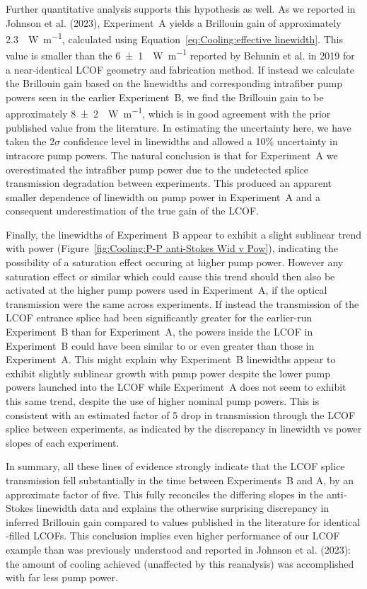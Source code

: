 Further quantitative analysis supports this hypothesis as well. As we reported in Johnson et al. (2023), \cite{johnson2023laser} Experiment~A yields a Brillouin gain of approximately \SI{2.3}{\per\watt\per\meter}, calculated using Equation~\ref{eq:Cooling:effective linewidth}. This value is smaller than the \SI{6(1)}{\per\watt\per\meter} reported by Behunin et al. in 2019 \cite{behunin2019spontaneous} for a near‐identical \ac{LCOF} geometry and fabrication method. If instead we calculate the Brillouin gain based on the linewidths and corresponding intrafiber pump powers seen in the earlier Experiment~B, we find the Brillouin gain to be approximately \SI{8(2)}{\per\watt\per\meter}, which is in good agreement with the prior published value from the literature. In estimating the uncertainty here, we have taken the \(2\sigma\) confidence level in linewidths and allowed a 10\% uncertainty in intracore pump powers. The natural conclusion is that for Experiment~A we overestimated the intrafiber pump power due to the undetected splice transmission degradation between experiments. This produced an apparent smaller dependence of linewidth on pump power in Experiment~A and a consequent underestimation of the true gain of the \ac{LCOF}.

Finally, the linewidths of Experiment~B appear to exhibit a slight sublinear trend with power (Figure~\ref{fig:Cooling:P-P anti-Stokes Wid v Pow}), indicating the possibility of a saturation effect occuring at higher pump power. However any saturation effect or similar which could cause this trend should then also be activated at the higher pump powers used in Experiment~A, if the optical transmission were the same across experiments. If instead the transmission of the \ac{LCOF} entrance splice had been significantly greater for the earlier-run Experiment~B than for Experiment~A, the powers inside the \ac{LCOF} in Experiment~B could have been similar to or even greater than those in Experiment~A. This might explain why Experiment~B linewidths appear to exhibit slightly sublinear growth with pump power despite the lower pump powers launched into the \ac{LCOF} while Experiment~A does not seem to exhibit this same trend, despite the use of higher nominal pump powers. This is consistent with an estimated factor of 5 drop in transmission through the \ac{LCOF} splice between experiments, as indicated by the discrepancy in linewidth vs power slopes of each experiment.

In summary, all these lines of evidence strongly indicate that the \ac{LCOF} splice transmission fell substantially in the time between Experiments~B and A, by an approximate factor of five. This fully reconciles the differing slopes in the anti‐Stokes linewidth data and explains the otherwise surprising discrepancy in inferred Brillouin gain compared to values published in the literature for identical -filled \ac{LCOF}s. This conclusion implies even higher performance of our \ac{LCOF} example than was previously understood and reported in Johnson et al. (2023): \cite{johnson2023laser} the amount of cooling achieved (unaffected by this reanalysis) was accomplished with far less pump power.

